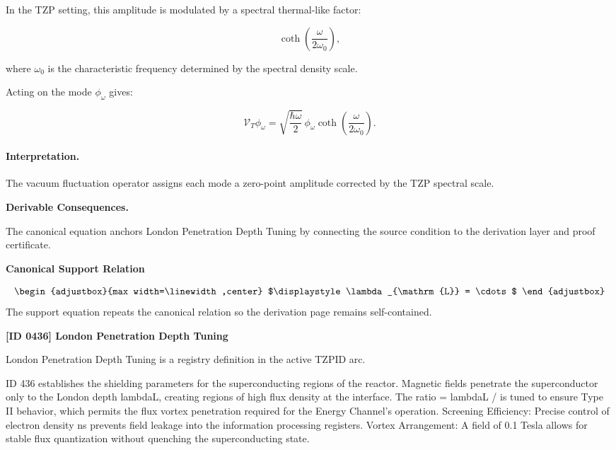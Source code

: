 In the TZP setting, this amplitude is modulated by a spectral thermal-like factor:

\begin{equation}
\coth\left(
\frac{\omega}{2\omega_0}
\right),
\end{equation}

where $\omega_0$ is the characteristic frequency determined by the spectral density scale.

Acting on the mode $\phi_{\omega}$ gives:

\begin{equation}
\boxed{
\mathcal{V}_T\phi_{\omega}
=
\sqrt{
\frac{\hbar\omega}{2}
}
\,\phi_{\omega}
\coth\left(
\frac{\omega}{2\omega_0}
\right).
}
\end{equation}

\paragraph{Interpretation.}
The vacuum fluctuation operator assigns each mode a zero-point amplitude corrected by the TZP spectral scale.

\par\vspace{0.35em}
\noindent\textbf{Derivable Consequences.}\quad
\begingroup
\footnotesize
\raggedright
The canonical equation anchors London Penetration Depth Tuning by connecting the source condition to the derivation layer and proof certificate.
\par\endgroup

\noindent\textbf{Canonical Support Relation}\par
\[
\begin{adjustbox}{max width=\linewidth,center}
$\displaystyle
\lambda_{\mathrm{L}} = \cdots
$
\end{adjustbox}
\]
\noindent The support equation repeats the canonical relation so the derivation page remains self-contained.\par

\clearpage
\noindent\textbf{[ID 0436] London Penetration Depth Tuning}\par
\vspace{0.35em}
\begingroup\small
{}
London Penetration Depth Tuning is a registry definition in the active TZPID arc.

ID 436 establishes the shielding parameters for the superconducting regions of the reactor. Magnetic fields penetrate the superconductor only to the London depth lambdaL, creating regions of high flux density at the interface. The ratio = lambdaL / is tuned to ensure Type II behavior, which permits the flux vortex penetration required for the Energy Channel's operation. Screening Efficiency: Precise control of electron density ns prevents field leakage into the information processing registers. Vortex Arrangement: A field of 0.1 Tesla allows for stable flux quantization without quenching the superconducting state.

